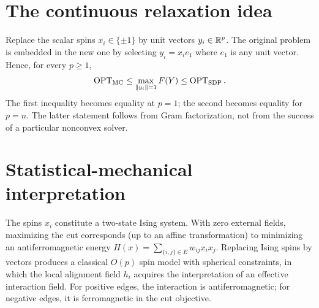 \section{The continuous relaxation idea}
Replace the scalar spins $x_i\in\{\pm1\}$ by unit vectors $y_i\in\mathbb{R}^p$. The original problem is embedded in the new one by selecting $y_i=x_ie_1$ where $e_1$ is any unit vector. Hence, for every $p\ge1$,
\begin{equation}
\operatorname{OPT}_{\mathrm{MC}}\le \max_{\left\lVert y_i\right\rVert=1}F(Y)\le\operatorname{OPT}_{\mathrm{SDP}}.
\end{equation}
The first inequality becomes equality at $p=1$; the second becomes equality for $p=n$. The latter statement follows from Gram factorization, not from the success of a particular nonconvex solver.

\section{Statistical-mechanical interpretation}
The spins $x_i$ constitute a two-state Ising system. With zero external fields, maximizing the cut corresponds (up to an affine transformation) to minimizing an antiferromagnetic energy $H(x)=\sum_{\{i,j\}\in E}w_{ij}x_ix_j$. Replacing Ising spins by vectors produces a classical $O(p)$ spin model with spherical constraints, in which the local alignment field $h_i$ acquires the interpretation of an effective interaction field. For positive edges, the interaction is antiferromagnetic; for negative edges, it is ferromagnetic in the cut objective.
